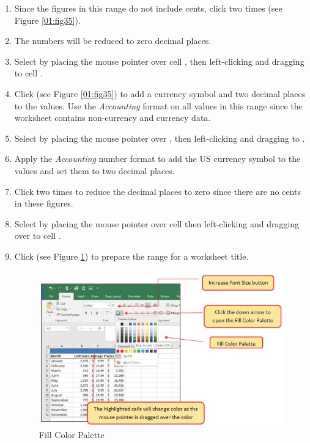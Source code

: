 \begin{enumbox}
	\begin{enumerate}
		\item Since the figures in this range do not include cents, click  two times (see Figure \ref{01:fig35}).
		\item The numbers will be reduced to zero decimal places.
		\item Select  by placing the mouse pointer over cell , then left-clicking and dragging to cell .
		\item Click  (see Figure \ref{01:fig35}) to add a currency symbol and two decimal places to the values. Use the \textit{Accounting} format on all values in this range since the worksheet contains non-currency and currency data.
		\item Select  by placing the mouse pointer over , then left-clicking and dragging to .
		\item Apply the \textit{Accounting} number format to add the US currency symbol to the values and set them to two decimal places.
		\item Click  two times to reduce the decimal places to zero since there are no cents in these figures.
		\item Select  by placing the mouse pointer over cell  then left-clicking and dragging over to cell .
		\item Click  (see Figure \ref{01:fig36}) to prepare the range for a worksheet title.

		\begin{figure}[H]
			\centering
			\includegraphics[width=\maxwidth{.95\linewidth}]{gfx/ch01_fig36}
			\caption{Fill Color Palette}
			\label{01:fig36}
		\end{figure}


\end{enumerate}
\end{enumbox}
